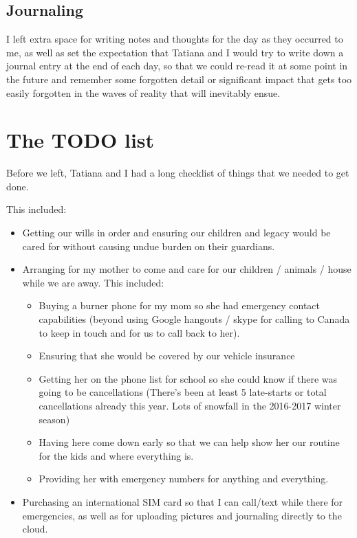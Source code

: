 \documentclass[letterpaper]{report}
\begin{document}
\subsection{Journaling}
I left extra space for writing notes and thoughts for the day as they occurred 
to me,
as well as set the expectation that Tatiana and I would try to write down a
journal entry at the end of each day, so that we could re-read it at some 
point in the future and remember some forgotten detail or significant impact
that gets too easily forgotten in the waves of reality that will inevitably
ensue.

\section{The TODO list}
Before we left, Tatiana and I had a long checklist
of things that we needed to get done.

This included:
\begin{itemize}
    \item Getting our wills in order and ensuring our children and legacy would
    be cared for without causing undue burden on their guardians.
    \item Arranging for my mother to come and care for our children / animals / house while we are away.  This included:
    \begin{itemize}
        \item Buying a burner phone for my mom so she had emergency contact 
        capabilities (beyond using Google hangouts / skype for calling to
        Canada to keep in touch and for us to call back to her).
        \item Ensuring that she would be covered by our vehicle insurance
        \item Getting her on the phone list for school so she could know if 
        there was going to be cancellations
        (There's been at least 5 late-starts or total cancellations already 
        this year. Lots of snowfall in the 2016-2017 winter season)
        \item Having here come down early so that we can help show her our routine for the kids and where everything is.
        \item Providing her with emergency numbers for anything and everything.
    \end{itemize}
    \item Purchasing an international SIM card so that I can call/text while
    there for emergencies,
    as well as for uploading pictures and journaling
    directly to the cloud.
\end{itemize}
\end{document}
